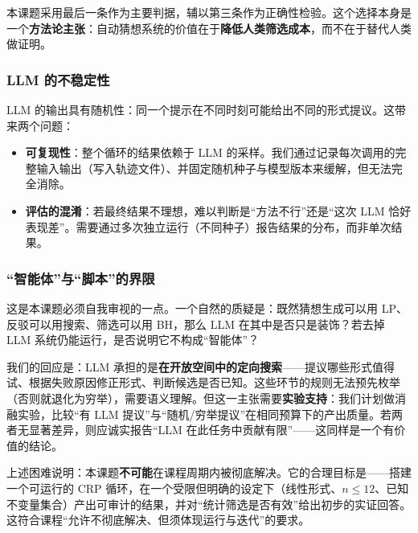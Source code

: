 本课题采用最后一条作为主要判据，辅以第三条作为正确性检验。这个选择本身是一个\textbf{方法论主张}：自动猜想系统的价值在于\textbf{降低人类筛选成本}，而不在于替代人类做证明。

\subsubsection{LLM 的不稳定性}

LLM 的输出具有随机性：同一个提示在不同时刻可能给出不同的形式提议。这带来两个问题：

\begin{itemize}
  \item \textbf{可复现性}：整个循环的结果依赖于 LLM 的采样。我们通过记录每次调用的完整输入输出（写入轨迹文件）、并固定随机种子与模型版本来缓解，但无法完全消除。
  \item \textbf{评估的混淆}：若最终结果不理想，难以判断是“方法不行”还是“这次 LLM 恰好表现差”。需要通过多次独立运行（不同种子）报告结果的分布，而非单次结果。
\end{itemize}

\subsubsection{“智能体”与“脚本”的界限}

这是本课题必须自我审视的一点。一个自然的质疑是：既然猜想生成可以用 LP、反驳可以用搜索、筛选可以用 BH，那么 LLM 在其中是否只是装饰？若去掉 LLM 系统仍能运行，是否说明它不构成“智能体”？

我们的回应是：LLM 承担的是\textbf{在开放空间中的定向搜索}——提议哪些形式值得试、根据失败原因修正形式、判断候选是否已知。这些环节的规则无法预先枚举（否则就退化为穷举），需要语义理解。但这一主张需要\textbf{实验支持}：我们计划做消融实验，比较“有 LLM 提议”与“随机/穷举提议”在相同预算下的产出质量。若两者无显著差异，则应诚实报告“LLM 在此任务中贡献有限”——这同样是一个有价值的结论。

\begin{notebox}[关于本课题的定位]
上述困难说明：本课题\textbf{不可能}在课程周期内被彻底解决。它的合理目标是——搭建一个可运行的 CRP 循环，在一个受限但明确的设定下（线性形式、$n\le 12$、已知不变量集合）产出可审计的结果，并对“统计筛选是否有效”给出初步的实证回答。这符合课程“允许不彻底解决、但须体现运行与迭代”的要求。
\end{notebox}
